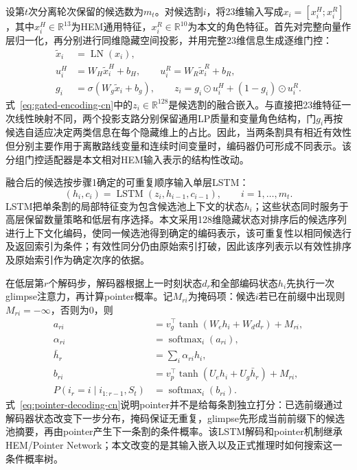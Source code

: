 \documentclass[journal]{IEEEtran}
\begin{document}
设第$t$次分离轮次保留的候选数为$m_t$。对候选割$i$，将23维输入写成$x_i=[x_i^{H};x_i^{R}]$，其中$x_i^{H}\in\mathbb R^{13}$为HEM通用特征，$x_i^{R}\in\mathbb R^{10}$为本文的角色特征。首先对完整向量作层归一化，再分别进行同维隐藏空间投影，并用完整23维信息生成逐维门控：
\begin{equation}
\begin{aligned}
\widetilde x_i&=\operatorname{LN}(x_i),\\
u_i^{H}&=W_H\widetilde x_i^{H}+b_H,\qquad
u_i^{R}=W_R\widetilde x_i^{R}+b_R,\\
g_i&=\sigma(W_g\widetilde x_i+b_g),\qquad
z_i=g_i\odot u_i^{H}+(1-g_i)\odot u_i^{R}.
\end{aligned}
\label{eq:gated-encoding-cn}
\end{equation}
式~\eqref{eq:gated-encoding-cn}中的$z_i\in\mathbb R^{128}$是候选割的融合嵌入。与直接把23维特征一次线性映射不同，两个投影支路分别保留通用LP质量和变量角色结构，门$g_i$再按候选自适应决定两类信息在每个隐藏维上的占比。因此，当两条割具有相近有效性但分别主要作用于离散路线变量和连续时间变量时，编码器仍可形成不同表示。该分组门控适配器是本文相对HEM输入表示的结构性改动。

融合后的候选按步骤1确定的可重复顺序输入单层LSTM：
\begin{equation}
(h_i,c_i)=\operatorname{LSTM}(z_i,h_{i-1},c_{i-1}),\qquad i=1,\ldots,m_t .
\label{eq:lstm-encoding-cn}
\end{equation}
LSTM把单条割的局部特征变为包含候选池上下文的状态$h_i$；这些状态同时服务于高层保留数量策略和低层有序选择。本文采用128维隐藏状态对排序后的候选序列进行上下文化编码，使同一候选池得到确定的编码表示，该可重复性以相同候选行及返回索引为条件；有效性同分仍由原始索引打破，因此该序列表示以有效性排序及原始索引作为确定次序的依据。

在低层第$r$个解码步，解码器根据上一时刻状态$d_r$和全部编码状态$h_i$先执行一次glimpse注意力，再计算pointer概率。记$M_{ri}$为掩码项：候选$i$若已在前缀中出现则$M_{ri}=-\infty$，否则为0，则
\begin{equation}
\begin{aligned}
a_{ri}&=v_g^\top\tanh(W_e h_i+W_d d_r)+M_{ri},\\
\alpha_{ri}&=\operatorname{softmax}_i(a_{ri}),\\
\bar h_r&=\sum_i\alpha_{ri}h_i,\\
b_{ri}&=v_p^\top\tanh(U_e h_i+U_g\bar h_r)+M_{ri},\\
P(i_r=i\mid i_{1:r-1},S_t)&=\operatorname{softmax}_i(b_{ri}).
\end{aligned}
\label{eq:pointer-decoding-cn}
\end{equation}
式~\eqref{eq:pointer-decoding-cn}说明pointer并不是给每条割独立打分：已选前缀通过解码器状态改变下一步分布，掩码保证无重复，glimpse先形成当前前缀下的候选池摘要，再由pointer产生下一条割的条件概率。该LSTM解码和pointer机制继承HEM/Pointer Network；本文改变的是其输入嵌入以及正式推理时如何搜索这一条件概率树。
\end{document}
